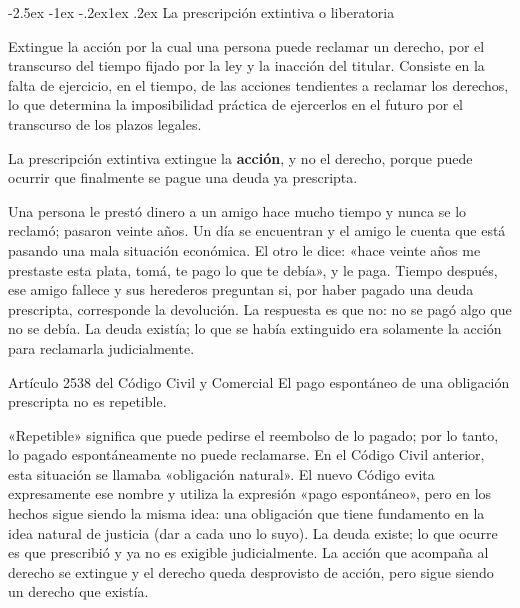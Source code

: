 \documentclass[12pt,oneside]{book}
\makeatletter
\renewcommand\subsection{\@startsection{subsection}{2}{\z@}%
  {-2.5ex \@plus -1ex \@minus -.2ex}{1ex \@plus .2ex}%
  {\normalfont\normalsize\bfseries}}
\makeatother
\begin{document}
\subsection{La prescripción extintiva o liberatoria}

\begin{definicion}
Extingue la acción por la cual una persona puede reclamar un derecho, por el transcurso del tiempo fijado por la ley y la inacción del titular. Consiste en la falta de ejercicio, en el tiempo, de las acciones tendientes a reclamar los derechos, lo que determina la imposibilidad práctica de ejercerlos en el futuro por el transcurso de los plazos legales.
\end{definicion}

\begin{importante}
La prescripción extintiva extingue la \textbf{acción}, y no el derecho, porque puede ocurrir que finalmente se pague una deuda ya prescripta.
\end{importante}

\begin{ejemplo}
Una persona le prestó dinero a un amigo hace mucho tiempo y nunca se lo reclamó; pasaron veinte años. Un día se encuentran y el amigo le cuenta que está pasando una mala situación económica. El otro le dice: «hace veinte años me prestaste esta plata, tomá, te pago lo que te debía», y le paga. Tiempo después, ese amigo fallece y sus herederos preguntan si, por haber pagado una deuda prescripta, corresponde la devolución. La respuesta es que no: no se pagó algo que no se debía. La deuda existía; lo que se había extinguido era solamente la acción para reclamarla judicialmente.
\end{ejemplo}

\begin{articulo}{Artículo 2538 del Código Civil y Comercial}
El pago espontáneo de una obligación prescripta no es repetible.
\end{articulo}

«Repetible» significa que puede pedirse el reembolso de lo pagado; por lo tanto, lo pagado espontáneamente no puede reclamarse. En el Código Civil anterior, esta situación se llamaba «obligación natural». El nuevo Código evita expresamente ese nombre y utiliza la expresión «pago espontáneo», pero en los hechos sigue siendo la misma idea: una obligación que tiene fundamento en la idea natural de justicia (dar a cada uno lo suyo). La deuda existe; lo que ocurre es que prescribió y ya no es exigible judicialmente. La acción que acompaña al derecho se extingue y el derecho queda desprovisto de acción, pero sigue siendo un derecho que existía.
\end{document}
